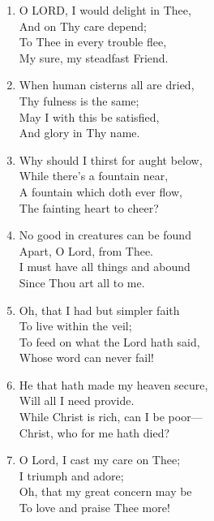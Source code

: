 \documentclass[11pt,a4paper]{article}
\begin{document}
\begin{enumerate}
    \item O LORD, I would delight in Thee, \\
        And on Thy care depend; \\
        To Thee in every trouble flee, \\
        My sure, my steadfast Friend.

    \item When human cisterns all are dried, \\
        Thy fulness is the same; \\
        May I with this be satisfied, \\
        And glory in Thy name.

    \item Why should I thirst for aught below, \\
        While there's a fountain near, \\
        A fountain which doth ever flow, \\
        The fainting heart to cheer?

    \item No good in creatures can be found \\
        Apart, O Lord, from Thee. \\
        I must have all things and abound \\
        Since Thou art all to me.

    \item Oh, that I had but simpler faith \\
        To live within the veil; \\
        To feed on what the Lord hath said, \\
        Whose word can never fail!

    \item He that hath made my heaven secure, \\
        Will all I need provide. \\
        While Christ is rich, can I be poor--- \\
        Christ, who for me hath died?

    \item O Lord, I cast my care on Thee; \\
        I triumph and adore; \\
        Oh, that my great concern may be \\
        To love and praise Thee more!

\end{enumerate}
\end{document}
